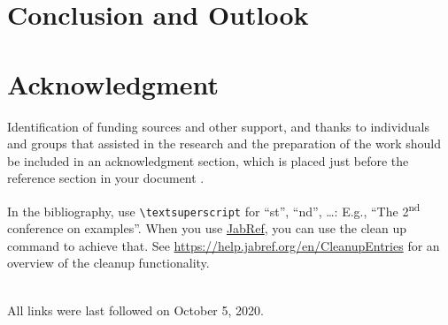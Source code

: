 \documentclass[conference,a4paper,english]{IEEEtran}[2015/08/26]
\begin{document}
\section{Conclusion and Outlook}
\label{sec:outlook}
\lipsum[1-2]

\section*{Acknowledgment}

Identification of funding sources and other support, and thanks to individuals and groups that assisted in the research and the preparation of the work should be included in an acknowledgment section, which is placed just before the reference section in your document \cite{acmart}.


In the bibliography, use \texttt{\textbackslash textsuperscript} for \enquote{st}, \enquote{nd}, \ldots:
E.g., \enquote{The 2\textsuperscript{nd} conference on examples}.
When you use \href{https://www.jabref.org}{JabRef}, you can use the clean up command to achieve that.
See \url{https://help.jabref.org/en/CleanupEntries} for an overview of the cleanup functionality.





\ \\
%
All links were last followed on October 5, 2020.
\end{document}
